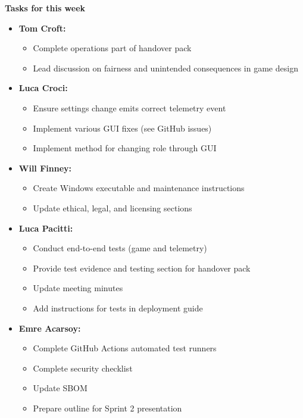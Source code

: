 \documentclass[11pt]{article}
\begin{document}
    \textbf{Tasks for this week}
    \begin{itemize}
        \item \textbf{Tom Croft:}
        \begin{itemize}
            \item Complete operations part of handover pack
            \item Lead discussion on fairness and unintended consequences in game design
        \end{itemize}

        \item \textbf{Luca Croci:}
        \begin{itemize}
            \item Ensure settings change emits correct telemetry event
            \item Implement various GUI fixes (see GitHub issues)
            \item Implement method for changing role through GUI
        \end{itemize}

        \item \textbf{Will Finney:}
        \begin{itemize}
            \item Create Windows executable and maintenance instructions
            \item Update ethical, legal, and licensing sections
        \end{itemize}

        \item \textbf{Luca Pacitti:}
        \begin{itemize}
            \item Conduct end-to-end tests (game and telemetry)
            \item Provide test evidence and testing section for handover pack
            \item Update meeting minutes
            \item Add instructions for tests in deployment guide
        \end{itemize}

        \item \textbf{Emre Acarsoy:}
        \begin{itemize}
            \item Complete GitHub Actions automated test runners
            \item Complete security checklist
            \item Update SBOM
            \item Prepare outline for Sprint 2 presentation
        \end{itemize}


\end{itemize}
\end{document}
